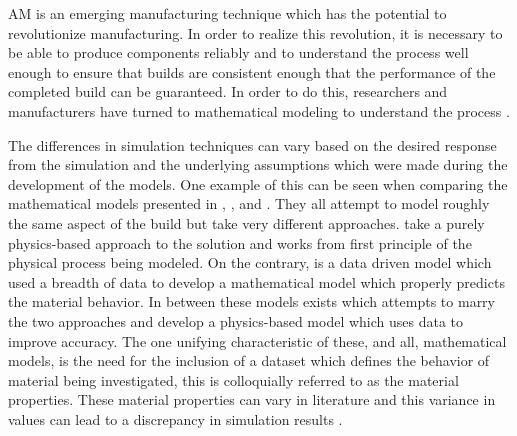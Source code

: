 \label{introAMsim}

\Acf{AM} is an emerging manufacturing technique which has the potential to revolutionize manufacturing.  In order to realize this revolution, it is necessary to be able to produce components reliably and to understand the process well enough to ensure that builds are consistent enough that the performance of the completed build can be guaranteed.  In order to do this, researchers and manufacturers have turned to mathematical modeling to understand the process \cite{wangClosedLoopHighFidelitySimulation2021}.

The differences in simulation techniques can vary based on the desired response from the simulation and the underlying assumptions which were made during the development of the models.
One example of this can be seen when comparing the mathematical models presented in \cite{wangClosedLoopHighFidelitySimulation2021}, \cite{royDatadrivenModelingThermal2020}, and \cite{mogesHYBRIDMODELINGAPPROACH2020}.  They all attempt to model roughly the same aspect of the build but take very different approaches.
\cite{wangClosedLoopHighFidelitySimulation2021} take a purely physics-based approach to the solution and works from first principle of the physical process being modeled.
On the contrary, \cite{royDatadrivenModelingThermal2020} is a data driven model which used a breadth of data to develop a mathematical model which properly predicts the material behavior. 
In between these models exists \cite{mogesHYBRIDMODELINGAPPROACH2020} which attempts to marry the two approaches and develop a physics-based model which uses data to improve accuracy.
The one unifying characteristic of these, and all, mathematical models, is the need for the inclusion of a dataset which defines the behavior of material being investigated, this is colloquially referred to as the material properties.  These material properties can vary in literature and this variance in values can lead to a discrepancy in simulation results \cite{Daryabeigi2011}.

